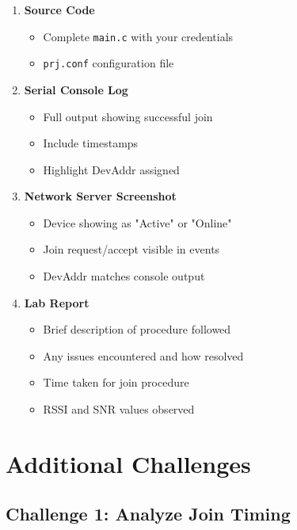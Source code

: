 \documentclass[11pt,a4paper]{article}
\begin{document}
\begin{enumerate}[itemsep=10pt]
    \item \textbf{Source Code}
    \begin{itemize}
        \item Complete \texttt{main.c} with your credentials
        \item \texttt{prj.conf} configuration file
    \end{itemize}

    \item \textbf{Serial Console Log}
    \begin{itemize}
        \item Full output showing successful join
        \item Include timestamps
        \item Highlight DevAddr assigned
    \end{itemize}

    \item \textbf{Network Server Screenshot}
    \begin{itemize}
        \item Device showing as "Active" or "Online"
        \item Join request/accept visible in events
        \item DevAddr matches console output
    \end{itemize}

    \item \textbf{Lab Report}
    \begin{itemize}
        \item Brief description of procedure followed
        \item Any issues encountered and how resolved
        \item Time taken for join procedure
        \item RSSI and SNR values observed
    \end{itemize}
\end{enumerate}

\section{Additional Challenges}

\subsection{Challenge 1: Analyze Join Timing}
\end{document}
